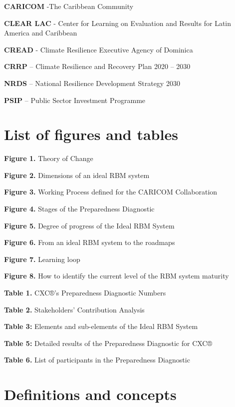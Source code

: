 \documentclass[
  10pt,
]{book}
\begin{document}
\textbf{CARICOM} -The Caribbean Community

\textbf{CLEAR LAC} - Center for Learning on Evaluation and Results for Latin America and Caribbean

\textbf{CREAD} - Climate Resilience Executive Agency of Dominica

\textbf{CRRP} -- Climate Resilience and Recovery Plan 2020 -- 2030

\textbf{NRDS} -- National Resilience Development Strategy 2030

\textbf{PSIP} -- Public Sector Investment Programme

\hypertarget{list-of-figures-and-tables}{%
\chapter*{List of figures and tables}\label{list-of-figures-and-tables}}

\textbf{Figure 1.} Theory of Change

\textbf{Figure 2.} Dimensions of an ideal RBM system

\textbf{Figure 3.} Working Process defined for the CARICOM Collaboration

\textbf{Figure 4.} Stages of the Preparedness Diagnostic

\textbf{Figure 5.} Degree of progress of the Ideal RBM System

\textbf{Figure 6.} From an ideal RBM system to the roadmaps

\textbf{Figure 7.} Learning loop

\textbf{Figure 8.} How to identify the current level of the RBM system maturity

\textbf{Table 1.} CXC®'s Preparedness Diagnostic Numbers

\textbf{Table 2.} Stakeholders' Contribution Analysis

\textbf{Table 3:} Elements and sub-elements of the Ideal RBM System

\textbf{Table 5:} Detailed results of the Preparedness Diagnostic for CXC®

\textbf{Table 6.} List of participants in the Preparedness Diagnostic

\hypertarget{definitions-and-concepts}{%
\chapter*{Definitions and concepts}\label{definitions-and-concepts}}
\end{document}
